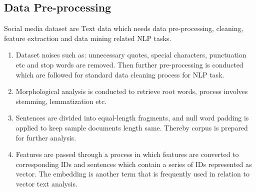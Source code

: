 \documentclass[sn-mathphys,Numbered]{sn-jnl}%
\theoremstyle{thmstyleone}%
\theoremstyle{thmstyletwo}%
\theoremstyle{thmstylethree}%
\begin{document}
\subsection{Data Pre-processing}\label{data_preprocessing}
Social media dataset are Text data which needs data pre-processing, cleaning, feature extraction and data mining related NLP tasks.
\begin{enumerate}[label=(\roman*)]
\item Dataset noises such as: unnecessary quotes, special characters, punctuation etc and stop words are removed. Then further pre-processing is conducted which are followed for standard data cleaning process for NLP task. 
\item Morphological analysis is conducted to retrieve root words, process involves stemming, lemmatization etc.
\item Sentences are divided into equal-length fragments, and null word padding is applied to keep sample documents length same. Thereby corpus is prepared for further analysis.
\item Features are passed through a process in which features are converted to corresponding IDs and sentences which contain a series of IDs represented as vector. The embedding is another term that is frequently used in relation to vector text analysis. 
\end{enumerate}
\end{document}
